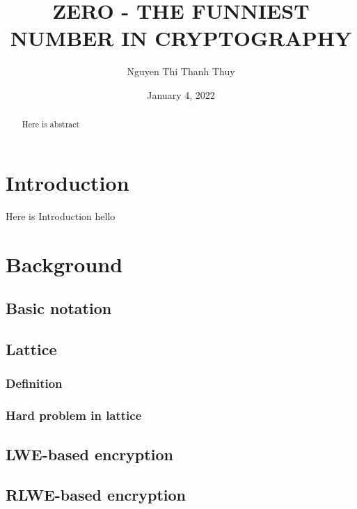 \documentclass[A4paper,12pt]{article}
\title{}
\author{}
\begin{document}
\newtheorem{definition}{Definition}[section]
\title{\textbf{ZERO - THE FUNNIEST NUMBER IN CRYPTOGRAPHY}}
\author{Nguyen Thi Thanh Thuy\\ }
\date{January 4, 2022}
\maketitle

\newpage
\tableofcontents
\newpage
\listoffigures

\newpage

\begin{abstract}
Here is abstract
\end{abstract}


\section{Introduction}
Here is Introduction
hello
\newpage
{}
\section{Background}

\subsection{Basic notation}
\subsection{Lattice}

\subsubsection{Definition}
\subsubsection{Hard problem in lattice}
\subsection{LWE-based encryption}
\subsection{RLWE-based encryption}
\newpage
\end{document}
